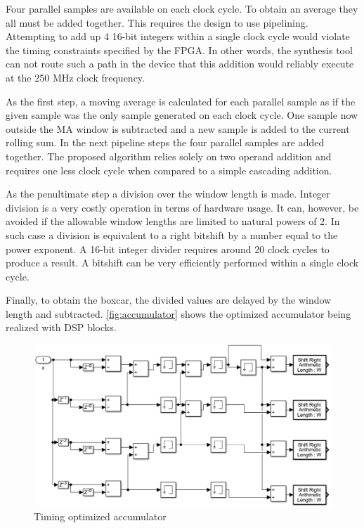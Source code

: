 Four parallel samples are available on each clock cycle. To obtain
an average they all must be added together. This requires the design
to use pipelining. Attempting to add up 4 16-bit integers within a single clock cycle
would violate the timing constraints specified by the FPGA. In other words,
the synthesis tool can not route such a path in the device
that this addition would reliably execute at the 250 MHz clock frequency.


As the first step, a moving average is calculated for each parallel sample 
as if the given sample was the only sample generated on each clock cycle. 
One sample now outside the MA window is subtracted and a new sample
is added to the current rolling sum. In the next pipeline steps 
the four parallel samples are added together. The proposed algorithm
relies solely on two operand addition and requires one less clock cycle
when compared to a simple cascading addition. 


As the penultimate step a division over the window length is made.
Integer division is a very costly operation in terms of hardware usage.
It can, however, be avoided if the allowable window lengths are limited to 
natural powers of 2. In such case a division is equivalent to a  
right bitshift by a number equal to the power exponent.
A 16-bit integer divider requires around 20 clock cycles to produce a result.
A bitshift can be very efficiently performed within a single clock cycle.


Finally, to obtain the boxcar, the divided values are delayed by the
window length and subtracted. \autoref{fig:accumulator} shows
the optimized accumulator being realized with DSP blocks.

\begin{figure}[H]
  \centering
  \includegraphics[width=\linewidth]{media/accumulator.png}
  \caption{Timing optimized accumulator}
  \label{fig:accumulator} 
\end{figure}

